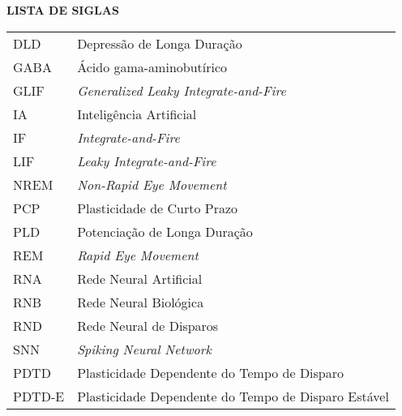 \begin{center}
\textbf{LISTA DE SIGLAS}
\end{center}
\vspace*{0.5cm}
\begin{tabular}{ll}
DLD & Depressão de Longa Duração \\
GABA & Ácido gama-aminobutírico \\
GLIF & \textit{Generalized Leaky Integrate-and-Fire} \\
IA & Inteligência Artificial \\
IF & \textit{Integrate-and-Fire} \\
LIF & \textit{Leaky Integrate-and-Fire} \\
NREM & \textit{Non-Rapid Eye Movement} \\
PCP & Plasticidade de Curto Prazo \\
PLD & Potenciação de Longa Duração \\
REM & \textit{Rapid Eye Movement} \\
RNA & Rede Neural Artificial \\
RNB & Rede Neural Biológica \\
RND & Rede Neural de Disparos \\
SNN & \textit{Spiking Neural Network} \\
PDTD & Plasticidade Dependente do Tempo de Disparo \\
PDTD-E & Plasticidade Dependente do Tempo de Disparo Estável \\

\end{tabular}
\addtocounter{table}{0}